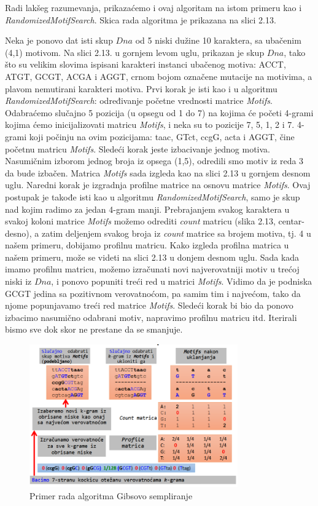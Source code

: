 Radi lakšeg razumevanja, prikazaćemo i ovaj algoritam na istom primeru kao i \textit{RandomizedMotifSearch}. Skica rada algoritma je prikazana na slici 2.13.

Neka je ponovo dat isti skup $Dna$ od 5 niski dužine 10 karaktera, sa ubačenim (4,1) motivom. Na slici 2.13. u gornjem levom uglu, prikazan je skup $Dna$, tako što su velikim slovima ispisani karakteri instanci ubačenog motiva: ACCT, ATGT, GCGT, ACGA i AGGT, crnom bojom označene mutacije na motivima, a plavom nemutirani karakteri motiva. Prvi korak je isti kao i u algoritmu \textit{RandomizedMotifSearch}: određivanje početne vrednosti matrice \textit{Motifs}. Odabraćemo slučajno 5 pozicija (u opsegu od 1 do 7) na kojima će početi 4-grami kojima ćemo inicijalizovati matricu \textit{Motifs}, i neka su to pozicije 7, 5, 1, 2 i 7. 4-grami koji počinju na ovim pozicijama: taac, GTct, ccgG, acta i AGGT, čine početnu matricu \textit{Motifs}. Sledeći korak jeste izbacivanje jednog motiva. Nasumičnim izborom jednog broja iz opsega (1,5), odredili smo motiv iz reda 3 da bude izbačen. Matrica \textit{Motifs} sada izgleda kao na slici 2.13 u gornjem desnom uglu. Naredni korak je izgradnja profilne matrice na osnovu matrice \textit{Motifs}. Ovaj postupak je takođe isti kao u algoritmu \textit{RandomizedMotifSearch}, samo je skup nad kojim radimo za jedan 4-gram manji. Prebrajanjem svakog karaktera u svakoj koloni matrice \textit{Motifs} možemo odrediti \textit{count} matricu (slika 2.13, centar-desno), a zatim deljenjem svakog broja iz \textit{count} matrice sa brojem motiva, tj. 4 u našem primeru, dobijamo profilnu matricu. Kako izgleda profilna matrica u našem primeru, može se videti na slici 2.13 u donjem desnom uglu. Sada kada imamo profilnu matricu, možemo izračunati novi najverovatniji motiv u trećoj niski iz $Dna$, i ponovo popuniti treći red u matrici \textit{Motifs}. Vidimo da je podniska GCGT jedina sa pozitivnom verovatnoćom, pa samim tim i najvećom, tako da njome popunjavamo treći red matrice \textit{Motifs}. Sledeći korak bi bio da ponovo izbacimo nasumično odabrani motiv, napravimo profilnu matricu itd. Iterirali bismo sve dok skor ne prestane da se smanjuje. 


\begin{figure}[h]
\caption{Primer rada algoritma Gibsovo sempliranje}
\centering
\includegraphics[width=0.8\textwidth]{poglavlja/2/slike/73.PNG}
\end{figure}

